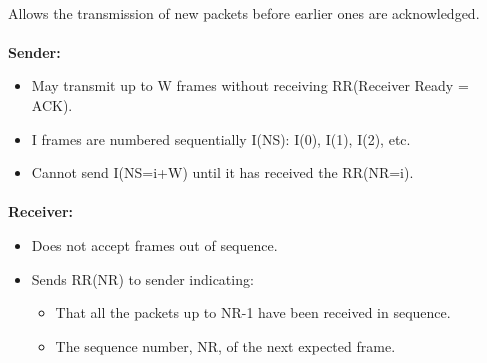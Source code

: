 \documentclass[../resumosRCOM.tex]{subfiles}
\begin{document}
\paragraph{}
Allows the transmission of new packets before earlier ones are acknowledged.

\paragraph{}
\textbf{Sender:}
\begin{itemize}
    \item May transmit up to W frames without receiving RR(Receiver Ready = ACK).
    \item I frames are numbered sequentially I(NS): I(0), I(1), I(2), etc.
    \item Cannot send I(NS=i+W) until it has received the RR(NR=i).   
\end{itemize}

\paragraph{}
\textbf{Receiver:}
\begin{itemize}
    \item Does not accept frames out of sequence.
    \item Sends RR(NR) to sender indicating:
    \begin{itemize}
        \item That all the packets up to NR-1 have been received in sequence.
        \item The sequence number, NR, of the next expected frame.
    \end{itemize}
\end{itemize}
\end{document}
